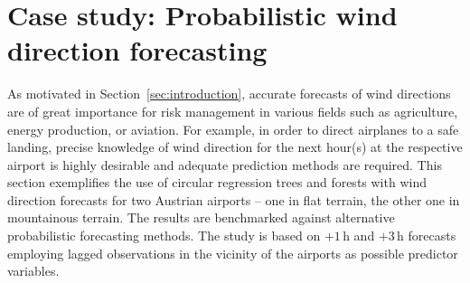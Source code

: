 \documentclass{statsoc}
\begin{document}
\section{Case study: Probabilistic wind direction forecasting}
\label{sec:wind}
As motivated in Section~\ref{sec:introduction}, accurate forecasts of wind
directions are of great importance for risk management in various fields such
as agriculture, energy production, or aviation. For example, in order to direct
airplanes to a safe landing, precise knowledge of wind direction for the next
hour(s) at the respective airport is highly desirable and adequate prediction
methods are required. This section exemplifies the use of circular regression
trees and forests with wind direction forecasts for two Austrian airports --
one in flat terrain, the other one in mountainous terrain. The results are
benchmarked against alternative probabilistic forecasting methods. The study is
based on $+1$\,h and $+3$\,h forecasts employing lagged observations in the
vicinity of the airports as possible predictor variables. 
\end{document}
